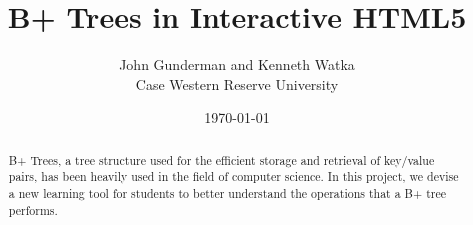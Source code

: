 \title{B+ Trees in Interactive HTML5}
\author{
  John Gunderman and Kenneth Watka \\
  Case Western Reserve University\\
}
\date{\today}

\maketitle

\begin{abstract}
B+ Trees, a tree structure used for the efficient storage and
retrieval of key/value pairs, has been heavily used in the field of
computer science. In this project, we devise a new learning tool for
students to better understand the operations that a B+ tree performs.
\end{abstract}

\vspace{.5in}







